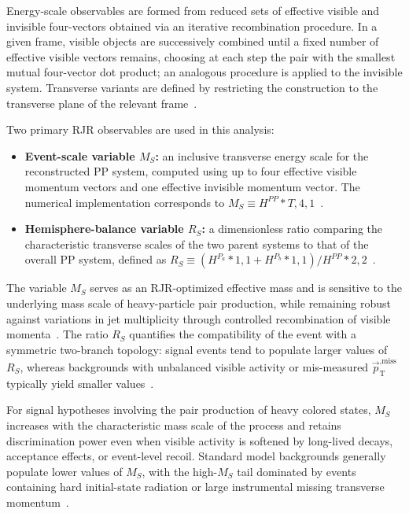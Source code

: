 Energy-scale observables are formed from reduced sets of effective visible and invisible four-vectors obtained via an iterative recombination procedure. In a given frame, visible objects are successively combined until a fixed number of effective visible vectors remains, choosing at each step the pair with the smallest mutual four-vector dot product; an analogous procedure is applied to the invisible system. Transverse variants are defined by restricting the construction to the transverse plane of the relevant frame~\cite{ATLAS_2018_RJR_JetMET_36fb}.

Two primary RJR observables are used in this analysis:
\begin{itemize}
\item \textbf{Event-scale variable $M_S$:} an inclusive transverse energy scale for the reconstructed PP system, computed using up to four effective visible momentum vectors and one effective invisible momentum vector. The numerical implementation corresponds to $M_S \equiv H^{PP}*{T,4,1}$~\cite{ATLAS_2018_RJR_JetMET_36fb}.
\item \textbf{Hemisphere-balance variable $R_S$:} a dimensionless ratio comparing the characteristic transverse scales of the two parent systems to that of the overall PP system, defined as $R_S \equiv \left(H^{P_a}*{1,1} + H^{P_b}*{1,1}\right)/H^{PP}*{2,2}$~\cite{ATLAS_2018_RJR_JetMET_36fb}.
\end{itemize}

The variable $M_S$ serves as an RJR-optimized effective mass and is sensitive to the underlying mass scale of heavy-particle pair production, while remaining robust against variations in jet multiplicity through controlled recombination of visible momenta~\cite{Jackson_2017_SparticlesInMotion}. The ratio $R_S$ quantifies the compatibility of the event with a symmetric two-branch topology: signal events tend to populate larger values of $R_S$, whereas backgrounds with unbalanced visible activity or mis-measured $\vec{p}_{\mathrm{T}}^{,\text{miss}}$ typically yield smaller values~\cite{ATLAS_2018_RJR_JetMET_36fb}.


For signal hypotheses involving the pair production of heavy colored states, $M_S$ increases with the characteristic mass scale of the process and retains discrimination power even when visible activity is softened by long-lived decays, acceptance effects, or event-level recoil. Standard model backgrounds generally populate lower values of $M_S$, with the high-$M_S$ tail dominated by events containing hard initial-state radiation or large instrumental missing transverse momentum~\cite{ATLAS_2018_RJR_JetMET_36fb}.


